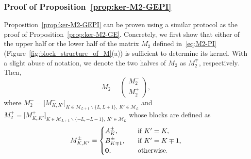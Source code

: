 \documentclass{article}
\numberwithin{equation}{section}
\def\calM{\mathcal{M}}
\def\MlL{{M}}
\def\Mpm{M^{\pm}}
\def\Mp{M^{+}}
\def\Mm{M^{-}}
\def\Apm{A^{\pm}}
\def\Bpm{B^{\pm}}
\begin{document}
\subsubsection{Proof of Proposition~\ref{prop:ker-M2-GEPI}}\label{sec:proof-half-mat-pi}
Proposition~\ref{prop:ker-M2-GEPI} can be proven using a similar protocol as the proof of Proposition~\ref{prop:ker-M2-GE}. Concretely, we first show that either of the upper half or the lower half of the matrix $\MlL_{2}$ defined in~\eqref{eq:M2-PI} (Figure~\ref{fig:block_structure_of_M}(a)) is sufficient to determine its kernel. With a slight abuse of notation, we denote the two halves of $\MlL_2$ as $\MlL_2^\mp$, respectively. Then,
\begin{equation}\label{eq:split-M-PI}
    \MlL_2 = \begin{pmatrix}
        \MlL_2^- \\
        \MlL_2^+
    \end{pmatrix},
\end{equation}
where 
$\Mm_{2}=\big[\Mm_{K,K'}\big]_{K\in \calM_{L+1}\backslash\{L,L+1\},~K'\in\calM_L}$ 
and
$\Mp_{2}=\big[\Mp_{K,K'}\big]_{K\in\calM_{L+1}\backslash\{-L,-L-1\},~K'\in\calM_L}$ 
whose blocks are defined as
\begin{equation*}
\Mpm_{K,K'} = \begin{cases}
    \Apm_{K}, 
    \quad & \textup{if } K'=K, \\
    \Bpm_{K\mp1}, 
    \quad & \textup{if } K'=K\mp 1, \\
    \mathbf{0}, \quad &\textup{otherwise.}
    \end{cases}
\end{equation*}
\end{document}
